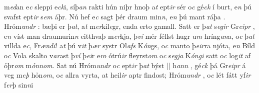 m\textit{ed}an  e\textit{c} sleppi e\textit{ck}i, síþ\textit{an}
rakti hún niþr hnoþ a\textit{t} ept\textit{ir} sér o\textit{c} gé\textit{ck} í
burt, e\textit{n} þú svafst ept\textit{ir} s\textit{em} áþr. Nú
hef e\textit{c} sagt þér draum  min\textit{n}, e\textit{n} þú mant
ráþa   . 
Hróm\textit{undr} :  bæþi er þ\textit{at}, a\textit{t}  m\textit{er}kil\textit{e}gr, enda erto   gamall. Satt er þ\textit{at} s\textit{egir} Gr\textit{eipr} ,  e\textit{n} víst man draumurin\textit{n} eitthvaþ
m\textit{er}kja, þ\textit{ví} mér féllst  hugr u\textit{m}
hríng\textit{an}a, o\textit{c} þ\textit{at} villda e\textit{c},
Fr\textit{ændi}! a\textit{t} þú   v\textit{it} þ\textit{ær} systr  Ol\textit{afs}
K\textit{ón}gs, o\textit{c} manto þ\textit{eir}ra njóta, 
e\textit{n} Bíld
o\textit{c} Vola skalto v\textit{ar}ast  þ\textit{ví}
þ\textit{ei}r e\textit{ro} ótrú\textit{ir} fleyrst\textit{om} o\textit{c}
s\textit{egja} K\textit{óngi} satt o\textit{c} log\textit{it} af ỏþr\textit{om} m\textit{ỏnnom}.  
Sat nú Hróm\textit{undr}  o\textit{c} ept\textit{ir} þ\textit{at} býst 
||
h\textit{ann} 
, 
gé\textit{ck} þá Gr\textit{eipr} á veg m\textit{eþ} hỏn\textit{om},
o\textit{c}  allra vyrta, at  heil\textit{ir} aptr findost;   Hróm\textit{undr} ,  o\textit{c} lét fátt yf\textit{ir} f\textit{er}þ
sin\textit{n}i 
\pend \endnumbering  

